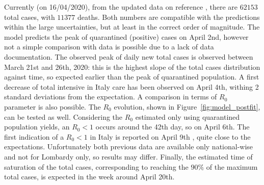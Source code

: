 Currently (on 16/04/2020), from the updated data on reference \cite{Lab24}, there are $62153$ total cases, with $11377$ deaths. Both numbers are compatible with the predictions within the large uncertainties, but at least in the correct order of magnitude. The model predicts the peak of quarantined (positive) cases on April 2nd, however not a simple comparison with data is possible due to a lack of data documentation. The observed peak of daily new total cases is observed between March 21st and 26th, 2020: this is the highest slope of the total cases distribution against time, so expected earlier than the peak of quarantined population. A first decrease of total intensive in Italy care has been observed on April 4th, withing 2 standard deviations from the expectation. A comparison in terms of $R_0$ parameter is also possible.  The $R_0$ evolution, shown in Figure~\ref{fig:model_postfit}, can be tested as well. Considering the $R_0$ estimated only using quarantined population yields, an $R_0<1$ occurs around the 42th day, so on April 6th. The first indication of a $R_0<1$ in Italy is reported on April 9th \cite{R0}, quite close to the expectations. Unfortunately both  previous data are available only national-wise and not for Lombardy only, so results may differ. Finally, the estimated time of saturation of the total cases, corresponding to  reaching the $90\%$ of the maximum total cases, is expected in the week around April 20th.\\



